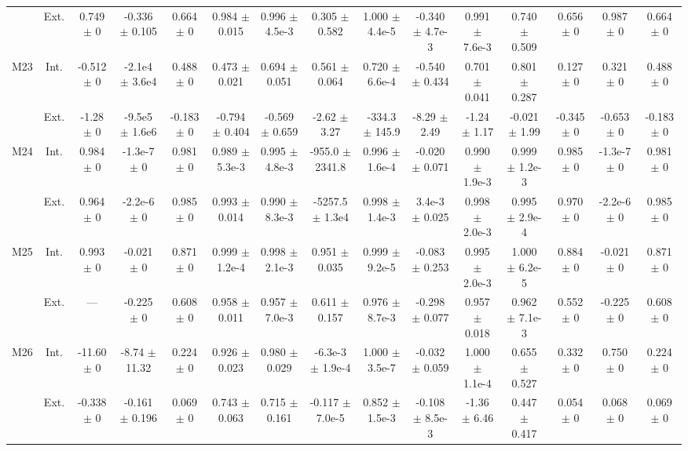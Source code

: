 \begin{table}[htbp]
{\begin{tabular}{@{}ccccccccccccccc@{}}
 & Ext. & 0.749 $\pm$ 0 & -0.336 $\pm$ 0.105 & 0.664 $\pm$ 0 & 0.984 $\pm$ 0.015 & 0.996 $\pm$ 4.5e-3 & 0.305 $\pm$ 0.582 & 1.000 $\pm$ 4.4e-5 & -0.340 $\pm$ 4.7e-3 & 0.991 $\pm$ 7.6e-3 & 0.740 $\pm$ 0.509 & 0.656 $\pm$ 0 & 0.987 $\pm$ 0 & 0.664 $\pm$ 0 \\
\cline{2-15}
\multirow{2}{*}{M23} & Int. & -0.512 $\pm$ 0 & -2.1e4 $\pm$ 3.6e4 & 0.488 $\pm$ 0 & 0.473 $\pm$ 0.021 & 0.694 $\pm$ 0.051 & 0.561 $\pm$ 0.064 & 0.720 $\pm$ 6.6e-4 & -0.540 $\pm$ 0.434 & 0.701 $\pm$ 0.041 & 0.801 $\pm$ 0.287 & 0.127 $\pm$ 0 & 0.321 $\pm$ 0 & 0.488 $\pm$ 0 \\
 & Ext. & -1.28 $\pm$ 0 & -9.5e5 $\pm$ 1.6e6 & -0.183 $\pm$ 0 & -0.794 $\pm$ 0.404 & -0.569 $\pm$ 0.659 & -2.62 $\pm$ 3.27 & -334.3 $\pm$ 145.9 & -8.29 $\pm$ 2.49 & -1.24 $\pm$ 1.17 & -0.021 $\pm$ 1.99 & -0.345 $\pm$ 0 & -0.653 $\pm$ 0 & -0.183 $\pm$ 0 \\
\cline{2-15}
\multirow{2}{*}{M24} & Int. & 0.984 $\pm$ 0 & -1.3e-7 $\pm$ 0 & 0.981 $\pm$ 0 & 0.989 $\pm$ 5.3e-3 & 0.995 $\pm$ 4.8e-3 & -955.0 $\pm$ 2341.8 & 0.996 $\pm$ 1.6e-4 & -0.020 $\pm$ 0.071 & 0.990 $\pm$ 1.9e-3 & 0.999 $\pm$ 1.2e-3 & 0.985 $\pm$ 0 & -1.3e-7 $\pm$ 0 & 0.981 $\pm$ 0 \\
 & Ext. & 0.964 $\pm$ 0 & -2.2e-6 $\pm$ 0 & 0.985 $\pm$ 0 & 0.993 $\pm$ 0.014 & 0.990 $\pm$ 8.3e-3 & -5257.5 $\pm$ 1.3e4 & 0.998 $\pm$ 1.4e-3 & 3.4e-3 $\pm$ 0.025 & 0.998 $\pm$ 2.0e-3 & 0.995 $\pm$ 2.9e-4 & 0.970 $\pm$ 0 & -2.2e-6 $\pm$ 0 & 0.985 $\pm$ 0 \\
\cline{2-15}
\multirow{2}{*}{M25} & Int. & 0.993 $\pm$ 0 & -0.021 $\pm$ 0 & 0.871 $\pm$ 0 & 0.999 $\pm$ 1.2e-4 & 0.998 $\pm$ 2.1e-3 & 0.951 $\pm$ 0.035 & 0.999 $\pm$ 9.2e-5 & -0.083 $\pm$ 0.253 & 0.995 $\pm$ 2.0e-3 & 1.000 $\pm$ 6.2e-5 & 0.884 $\pm$ 0 & -0.021 $\pm$ 0 & 0.871 $\pm$ 0 \\
 & Ext. & --- & -0.225 $\pm$ 0 & 0.608 $\pm$ 0 & 0.958 $\pm$ 0.011 & 0.957 $\pm$ 7.0e-3 & 0.611 $\pm$ 0.157 & 0.976 $\pm$ 8.7e-3 & -0.298 $\pm$ 0.077 & 0.957 $\pm$ 0.018 & 0.962 $\pm$ 7.1e-3 & 0.552 $\pm$ 0 & -0.225 $\pm$ 0 & 0.608 $\pm$ 0 \\
\cline{2-15}
\multirow{2}{*}{M26} & Int. & -11.60 $\pm$ 0 & -8.74 $\pm$ 11.32 & 0.224 $\pm$ 0 & 0.926 $\pm$ 0.023 & 0.980 $\pm$ 0.029 & -6.3e-3 $\pm$ 1.9e-4 & 1.000 $\pm$ 3.5e-7 & -0.032 $\pm$ 0.059 & 1.000 $\pm$ 1.1e-4 & 0.655 $\pm$ 0.527 & 0.332 $\pm$ 0 & 0.750 $\pm$ 0 & 0.224 $\pm$ 0 \\
 & Ext. & -0.338 $\pm$ 0 & -0.161 $\pm$ 0.196 & 0.069 $\pm$ 0 & 0.743 $\pm$ 0.063 & 0.715 $\pm$ 0.161 & -0.117 $\pm$ 7.0e-5 & 0.852 $\pm$ 1.5e-3 & -0.108 $\pm$ 8.5e-3 & -1.36 $\pm$ 6.46 & 0.447 $\pm$ 0.417 & 0.054 $\pm$ 0 & 0.068 $\pm$ 0 & 0.069 $\pm$ 0 \\

\end{tabular}}
\end{table}
